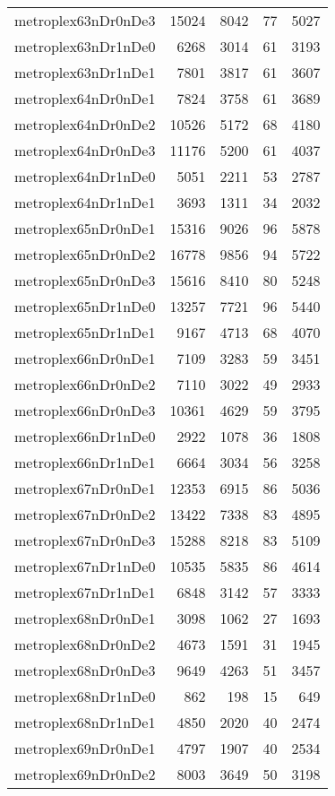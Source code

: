 \begin{longtable}{lrrrr}
metroplex63nDr0nDe3 & 15024 & 8042 & 77 & 5027 \\
metroplex63nDr1nDe0 & 6268 & 3014 & 61 & 3193 \\
metroplex63nDr1nDe1 & 7801 & 3817 & 61 & 3607 \\
metroplex64nDr0nDe1 & 7824 & 3758 & 61 & 3689 \\
metroplex64nDr0nDe2 & 10526 & 5172 & 68 & 4180 \\
metroplex64nDr0nDe3 & 11176 & 5200 & 61 & 4037 \\
metroplex64nDr1nDe0 & 5051 & 2211 & 53 & 2787 \\
metroplex64nDr1nDe1 & 3693 & 1311 & 34 & 2032 \\
metroplex65nDr0nDe1 & 15316 & 9026 & 96 & 5878 \\
metroplex65nDr0nDe2 & 16778 & 9856 & 94 & 5722 \\
metroplex65nDr0nDe3 & 15616 & 8410 & 80 & 5248 \\
metroplex65nDr1nDe0 & 13257 & 7721 & 96 & 5440 \\
metroplex65nDr1nDe1 & 9167 & 4713 & 68 & 4070 \\
metroplex66nDr0nDe1 & 7109 & 3283 & 59 & 3451 \\
metroplex66nDr0nDe2 & 7110 & 3022 & 49 & 2933 \\
metroplex66nDr0nDe3 & 10361 & 4629 & 59 & 3795 \\
metroplex66nDr1nDe0 & 2922 & 1078 & 36 & 1808 \\
metroplex66nDr1nDe1 & 6664 & 3034 & 56 & 3258 \\
metroplex67nDr0nDe1 & 12353 & 6915 & 86 & 5036 \\
metroplex67nDr0nDe2 & 13422 & 7338 & 83 & 4895 \\
metroplex67nDr0nDe3 & 15288 & 8218 & 83 & 5109 \\
metroplex67nDr1nDe0 & 10535 & 5835 & 86 & 4614 \\
metroplex67nDr1nDe1 & 6848 & 3142 & 57 & 3333 \\
metroplex68nDr0nDe1 & 3098 & 1062 & 27 & 1693 \\
metroplex68nDr0nDe2 & 4673 & 1591 & 31 & 1945 \\
metroplex68nDr0nDe3 & 9649 & 4263 & 51 & 3457 \\
metroplex68nDr1nDe0 & 862 & 198 & 15 & 649 \\
metroplex68nDr1nDe1 & 4850 & 2020 & 40 & 2474 \\
metroplex69nDr0nDe1 & 4797 & 1907 & 40 & 2534 \\
metroplex69nDr0nDe2 & 8003 & 3649 & 50 & 3198 \\

\end{longtable}
